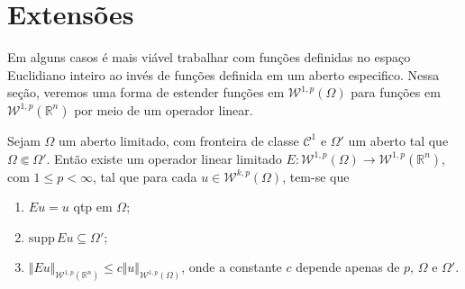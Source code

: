 \documentclass[a4paper, 11pt]{book}
\theoremstyle{definition}
\newcommand{\bR}{\mathbb{R}}
\newcommand{\cC}{\mathcal{C}}
\newcommand{\cW}{\mathcal{W}}
\newcommand{\supp}{\mathrm{supp}\,}
\begin{document}
\section{Extensões}

Em alguns casos é mais viável trabalhar com funções definidas no espaço Euclidiano inteiro ao invés de funções definida em um aberto especifico.
Nessa seção, veremos uma forma de estender funções em $\cW^{1,p}(\Omega)$ para funções em $\cW^{1,p}(\bR^n)$ por meio de um operador linear.

\begin{tbox} \label{thm:extensao}
        Sejam $\Omega$ um aberto limitado, com fronteira de classe $\cC^1$ e $\Omega'$ um aberto tal que $\Omega \Subset \Omega'$. Então existe um operador linear limitado $E : \cW^{1,p}(\Omega) \to \cW^{1,p}(\bR ^n)$, com $1 \leqslant p < \infty$, tal que para cada $u \in \cW^{k,p}(\Omega)$, tem-se que
    \begin{enumerate}[leftmargin=*, label=\textbf{(\alph*)}]
        \item $Eu = u$ qtp em $\Omega$;
        \item $\supp Eu \subseteq \Omega'$;
        \item $\Vert Eu \Vert_{\cW^{1,p}(\bR^n)} \leqslant c \Vert u \Vert_{\cW^{1,p}(\Omega)}$, onde a constante $c$ depende apenas de $p$, $\Omega$ e $\Omega'$.
    \end{enumerate}
\end{tbox}
\end{document}
